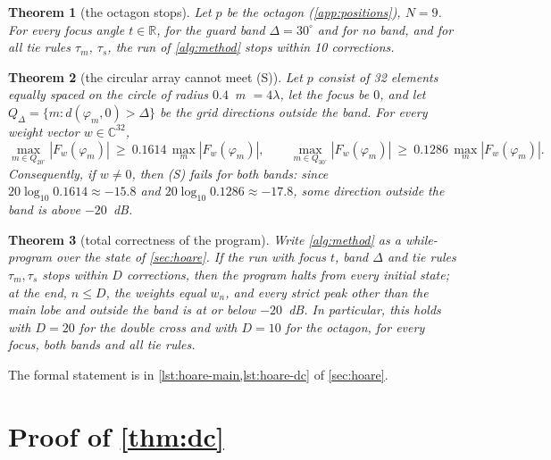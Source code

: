 \documentclass[11pt]{amsart}
\theoremstyle{plain}
\newtheorem{theorem}{Theorem}
\theoremstyle{definition}
\newcommand{\thy}[1]{\texttt{#1}}
\newcommand{\C}{\mathbb{C}}
\newcommand{\R}{\mathbb{R}}
\newcommand{\dist}{d}
\begin{document}
\begin{theorem}[the octagon stops]\label{thm:oct}
Let $p$ be the octagon (\cref{app:positions}), $N = 9$.  For every focus angle $t \in \R$, for the
guard band $\Delta = 30^\circ$ and for no band, and for all tie rules $\tau_m$, $\tau_s$, the run of
\cref{alg:method} stops within 10 corrections.
\end{theorem}



\begin{theorem}[the circular array cannot meet (S)]\label{thm:circ}
Let $p$ consist of 32 elements equally spaced on the circle of radius $0.4$~m $= 4\lambda$, let the
focus be $0$, and let $Q_\Delta = \{ m : \dist(\varphi_m, 0) > \Delta\}$ be the grid directions
outside the band.  For every weight vector $w \in \C^{32}$,
\[ \max_{m \in Q_{20^\circ}} |F_w(\varphi_m)| \ \ge\ 0.1614\, \max_{m} |F_w(\varphi_m)|, \qquad
   \max_{m \in Q_{30^\circ}} |F_w(\varphi_m)| \ \ge\ 0.1286\, \max_{m} |F_w(\varphi_m)| . \]
Consequently, if $w \neq 0$, then (S) fails for both bands: since $20\log_{10} 0.1614 \approx -15.8$
and $20\log_{10} 0.1286 \approx -17.8$, some direction outside the band is above $-20$~dB.
\end{theorem}




\begin{theorem}[total correctness of the program]\label{thm:hoare}
Write \cref{alg:method} as a while-program over the state of \cref{sec:hoare}.  If the run with
focus $t$, band $\Delta$ and tie rules $\tau_m, \tau_s$ stops within $D$ corrections, then the
program halts from every initial state; at the end, $n \le D$, the weights equal $w_n$, and every
strict peak other than the main lobe and outside the band is at or below $-20$~dB.  In particular,
this holds with $D = 20$ for the double cross and with $D = 10$ for the octagon, for every focus, both
bands and all tie rules.
\end{theorem}

The formal statement is in \cref{lst:hoare-main,lst:hoare-dc} of \cref{sec:hoare}.

\section{Proof of \texorpdfstring{\cref{thm:dc}}{Theorem 1}}\label{sec:proof-dc}
\end{document}
